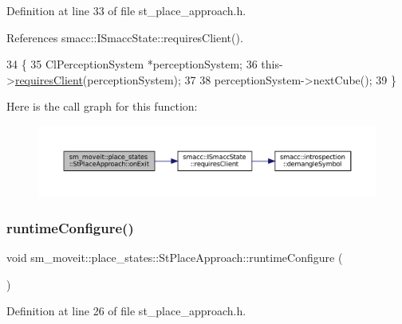 Definition at line 33 of file st\+\_\+place\+\_\+approach.\+h.



References smacc\+::\+I\+Smacc\+State\+::requires\+Client().


\begin{DoxyCode}
34     \{
35         ClPerceptionSystem *perceptionSystem;
36         this->\hyperlink{classsmacc_1_1ISmaccState_a7f95c9f0a6ea2d6f18d1aec0519de4ac}{requiresClient}(perceptionSystem);
37 
38         perceptionSystem->nextCube();
39     \}
\end{DoxyCode}
Here is the call graph for this function\+:
\nopagebreak
\begin{figure}[H]
\begin{center}
\leavevmode
\includegraphics[width=350pt]{structsm__moveit_1_1place__states_1_1StPlaceApproach_a4088322d84e4da8ce35253d2854a3710_cgraph}
\end{center}
\end{figure}
\mbox{\label{structsm__moveit_1_1place__states_1_1StPlaceApproach_a287b39f8eb6a5aca4f0b1e63cb275f7a}} 
\subsubsection{\texorpdfstring{runtime\+Configure()}{runtimeConfigure()}}
{\footnotesize\ttfamily void sm\+\_\+moveit\+::place\+\_\+states\+::\+St\+Place\+Approach\+::runtime\+Configure (\begin{DoxyParamCaption}{ }\end{DoxyParamCaption})\hspace{0.3cm}{\ttfamily [inline]}}



Definition at line 26 of file st\+\_\+place\+\_\+approach.\+h.



